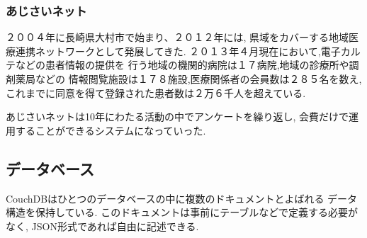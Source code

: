   \subsubsection{あじさいネット}
    ２００４年に長崎県大村市で始まり、２０１２年には,
    県域をカバーする地域医療連携ネットワークとして発展してきた.
    ２０１３年４月現在において,電子カルテなどの患者情報の提供を
    行う地域の機関的病院は１７病院,地域の診療所や調剤薬局などの
    情報閲覧施設は１７８施設,医療関係者の会員数は２８５名を数え,
    これまでに同意を得て登録された患者数は２万６千人を超えている.

    あじさいネットは10年にわたる活動の中でアンケートを繰り返し,
    会費だけで運用することができるシステムになっていった.
    \cite{bibi3}

\subsection{データベース}
  CouchDBはひとつのデータベースの中に複数のドキュメントとよばれる
  データ構造を保持している.
  このドキュメントは事前にテーブルなどで定義する必要がなく,
  JSON形式であれば自由に記述できる.

